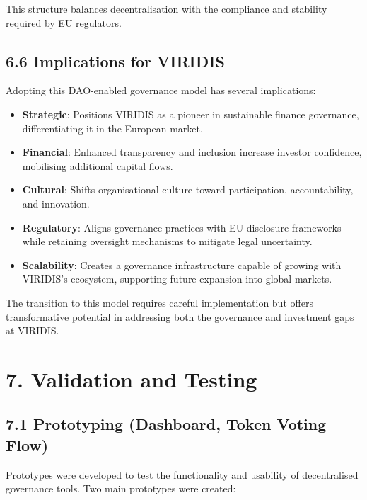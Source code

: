 \documentclass[
  english,
  12pt,
  oneside,
  open=any]{scrbook}
\providecommand{\tightlist}{%
  \setlength{\itemsep}{0pt}\setlength{\parskip}{0pt}}\usepackage{longtable,booktabs,array}
\begin{document}
This structure balances decentralisation with the compliance and
stability required by EU regulators.

\section{6.6 Implications for VIRIDIS}\label{sec-implications-viridis}

Adopting this DAO-enabled governance model has several implications:

\begin{itemize}
\tightlist
\item
  \textbf{Strategic}: Positions VIRIDIS as a pioneer in sustainable
  finance governance, differentiating it in the European market.\\
\item
  \textbf{Financial}: Enhanced transparency and inclusion increase
  investor confidence, mobilising additional capital flows.\\
\item
  \textbf{Cultural}: Shifts organisational culture toward participation,
  accountability, and innovation.\\
\item
  \textbf{Regulatory}: Aligns governance practices with EU disclosure
  frameworks while retaining oversight mechanisms to mitigate legal
  uncertainty.\\
\item
  \textbf{Scalability}: Creates a governance infrastructure capable of
  growing with VIRIDIS's ecosystem, supporting future expansion into
  global markets.
\end{itemize}

The transition to this model requires careful implementation but offers
transformative potential in addressing both the governance and
investment gaps at VIRIDIS.

\chapter{7. Validation and Testing}\label{sec-validation}

\section{7.1 Prototyping (Dashboard, Token Voting
Flow)}\label{sec-prototype}

Prototypes were developed to test the functionality and usability of
decentralised governance tools. Two main prototypes were created:
\end{document}
